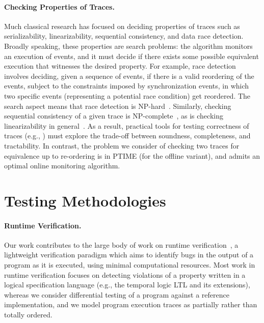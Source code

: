 \paragraph{Checking Properties of Traces.}
Much classical research has focused on deciding properties of traces such as serializability, linearizability, sequential consistency, and data race detection.
Broadly speaking, these properties are search problems: the algorithm monitors an execution of events, and it must decide if there exists some possible equivalent execution that witnesses the desired property. For example, race detection involves deciding, given a sequence of events, if there is a valid reordering of the events, subject to the constraints imposed by synchronization events, in which two specific events (representing a potential race condition) get reordered. The search aspect means that race detection is NP-hard~\cite{netzer1990complexity,netzer1992race}.
Similarly, checking sequential consistency of a given trace is NP-complete~\cite{gibbons1992complexity},
as is checking linearizability in general~\cite{gibbons1997testing}.
As a result, practical tools for testing correctness of traces (e.g., \cite{savage1997eraser,park2011efficient,sen2008race,wing1993testing,burckhardt2010line,lowe2017testing}) must explore the trade-off between soundness, completeness, and tractability.
In contrast, the problem we consider of checking two traces for equivalence up to re-ordering is in PTIME (for the offline variant), and admits an optimal online monitoring algorithm.

\section{Testing Methodologies}

\paragraph{Runtime Verification.}
Our work contributes to the large body of work on
runtime verification~\cite{leucker2009brief,havelund2004efficient}, a
lightweight verification paradigm which aims to identify bugs in the
output of a program as it is executed, using minimal computational
resources.  Most work in runtime verification focuses on detecting
violations of a property written in a logical specification language
(e.g., the temporal logic LTL and its extensions), whereas we consider
differential testing of a program against a reference implementation,
and we model program execution traces as partially rather than totally
ordered.

